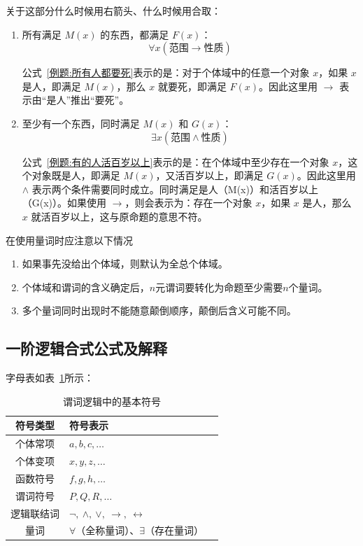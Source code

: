 \documentclass{ctexart}
\numberwithin{figure}{section}
\numberwithin{equation}{section}
\numberwithin{table}{section}
\begin{document}
        关于这部分什么时候用右箭头、什么时候用合取：
        \begin{enumerate}
            \item 所有满足 $M(x)$ 的东西，都满足 $F(x)$：
            \[
            \forall x(\text{范围} \rightarrow \text{性质})
            \]

            公式~\ref{例题:所有人都要死}表示的是：对于个体域中的任意一个对象 $x$，如果 $x$ 是人，即满足 $M(x)$，那么 $x$ 就要死，即满足 $F(x)$。因此这里用 $\rightarrow$ 表示由“是人”推出“要死”。

            \item 至少有一个东西，同时满足 $M(x)$ 和 $G(x)$：
            \[
            \exists x(\text{范围} \land \text{性质})
            \]

            公式~\ref{例题:有的人活百岁以上}表示的是：在个体域中至少存在一个对象 $x$，这个对象既是人，即满足 $M(x)$，又活百岁以上，即满足 $G(x)$。因此这里用 $\land$ 表示两个条件需要同时成立。同时满足是人（M(x)）和活百岁以上（G(x)）。如果使用 $\rightarrow$，则会表示为：存在一个对象 $x$，如果 $x$ 是人，那么 $x$ 就活百岁以上，这与原命题的意思不符。
        \end{enumerate}

        在使用量词时应注意以下情况
        \begin{enumerate}
            \item 如果事先没给出个体域，则默认为全总个体域。
            \item 个体域和谓词的含义确定后，$n$元谓词要转化为命题至少需要$n$个量词。
            \item 多个量词同时出现时不能随意颠倒顺序，颠倒后含义可能不同。
        \end{enumerate}
    \subsection{一阶逻辑合式公式及解释}
        字母表如表~\ref{tab:谓词逻辑基本符号}所示：
\begin{table}[htbp]
    \centering
    \caption{谓词逻辑中的基本符号}
    \label{tab:谓词逻辑基本符号}
    {\fontsize{10.5pt}{15pt}\selectfont
    \begin{tabular}{cll}
        \toprule
         符号类型 & 符号表示 \\
        \midrule
        个体常项 & $a,b,c,\dots$ \\
        个体变项 & $x,y,z,\dots$ \\
        函数符号 & $f,g,h,\dots$ \\
        谓词符号 & $P,Q,R,\dots$ \\
        逻辑联结词 & $\neg,\ \wedge,\ \vee,\ \rightarrow,\ \leftrightarrow$ \\
        量词 & $\forall$（全称量词）、$\exists$（存在量词） \\
        \bottomrule
    \end{tabular}
    }
\end{table}
\end{document}
